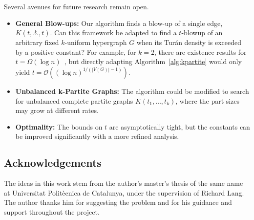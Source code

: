 \documentclass{amsart}
\newcommand{\compoverset}[2]{\ensuremath{K(#2, \overset{#1}{\dots}, #2)}}
\newcommand{\compdots}[2]{\ensuremath{K(#1, \dots, #2)}}
\newcommand{\bigO}[1]{\ensuremath{\mathcal{O}\left(#1\right)}}
\newcommand{\bigOmega}[1]{\ensuremath{\Omega\left(#1\right)}}
\begin{document}
    Several avenues for future research remain open.
    \begin{itemize}
        \item \textbf{General Blow-ups:} Our algorithm finds a blow-up of a single edge, $\compoverset{k}{t}$.
        Can this framework be adapted to find a $t$-blowup of an arbitrary fixed $k$-uniform hypergraph $G$ when its Tur\'{a}n density is exceeded by a positive constant?
        For example, for $k=2$, there are existence results for $t = \bigOmega{\log n}$~\cite{bollobas1973structure}, but directly adapting Algorithm~\ref{alg:kpartite} would only
        yield $t = \bigO{(\log n)^{1/(|V(G)| - 1)}}$.
        \item \textbf{Unbalanced k-Partite Graphs:} The algorithm could be modified to search for unbalanced complete partite graphs $\compdots{t_1}{t_k}$, where the part sizes may grow at different rates.
        \item \textbf{Optimality:} The bounds on $t$ are asymptotically tight, but the constants can be improved significantly with a more refined analysis.
    \end{itemize}


    \subsection*{Acknowledgements}

    The ideas in this work stem from the author's master's thesis of the same name at
    Universitat Polit\`{e}cnica de Catalunya,
    under the supervision of Richard Lang.
    The author thanks him for suggesting the problem and for his guidance and support throughout the project.

    
    
\end{document}
